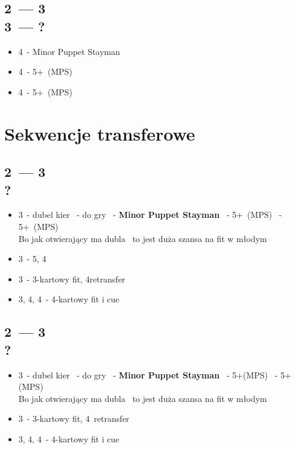 \documentclass[12pt, a4paper]{article}
\begin{document}
    \subsection{2\ntx\ --- 3\clubs\ \\ 3\ntx\ --- ?}
    \begin{itemize}
        \item 4\clubs\ - Minor Puppet Stayman
        \item 4\diams\ - 5+\clubs\ (MPS)
        \item 4\hearts\ - 5+\diams\ (MPS)
    \end{itemize}


    \pagebreak
    \section{Sekwencje transferowe}
    \subsection{2\ntx\ --- 3\diams \\ ?}
    \begin{itemize}
        \item 3\hearts\ - dubel kier
        \nt\ - do gry
        \clubs\ - \textbf{Minor Puppet Stayman}
        \diams\ - 5+\clubs\ (MPS)
        \hearts\ - 5+\diams\ (MPS)\\
        Bo jak otwierający ma dubla \hearts\ to jest duża szansa na fit w młodym
        \item 3\spades\ - 5\hearts, 4\spades
        \item 3\nt\ - 3-kartowy fit, 4\diams retransfer
        \item 3\spades, 4\clubs, 4\diams\ - 4-kartowy fit i cue
    \end{itemize}

    \subsection{2\ntx\ --- 3\hearts \\ ?}
    \begin{itemize}
        \item 3\spades\ - dubel kier
        \nt\ - do gry
        \clubs\ - \textbf{Minor Puppet Stayman}
        \diams\ - 5+\clubs (MPS)
        \hearts\ - 5+\diams (MPS)\\
        Bo jak otwierający ma dubla \spades\ to jest duża szansa na fit w młodym
        \item 3\nt\ - 3-kartowy fit, 4\hearts\ retransfer
        \item 3\spades, 4\clubs, 4\diams\ - 4-kartowy fit i cue
    \end{itemize}
\end{document}
